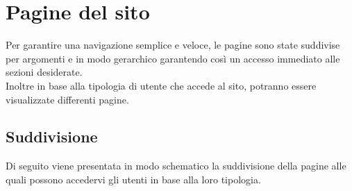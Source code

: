 \section{Pagine del sito}
Per garantire una navigazione semplice e veloce, le pagine sono state suddivise per argomenti e in modo gerarchico garantendo così un accesso immediato alle sezioni desiderate.\\
Inoltre in base alla tipologia di utente che accede al sito, potranno essere visualizzate differenti pagine.\\

\subsection{Suddivisione}
Di seguito viene presentata in modo schematico la suddivisione della pagine alle quali possono accedervi gli utenti in base alla loro tipologia.

